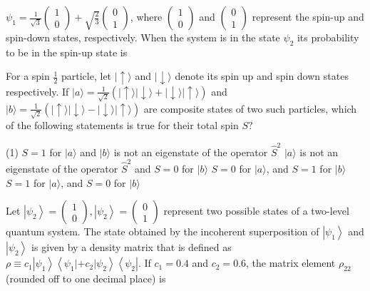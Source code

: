 \begin{enumerate}
\begin{minipage}{\textwidth}
	$\psi_{1}=\frac{1}{\sqrt{3}}\left(\begin{array}{l}1 \\ 0\end{array}\right)+\sqrt{\frac{2}{3}}\left(\begin{array}{l}0 \\ 1\end{array}\right)$, where $\left(\begin{array}{l}1 \\ 0\end{array}\right)$ and $\left(\begin{array}{l}0 \\ 1\end{array}\right)$ represent the spin-up and spin-down states, respectively. When the system is in the state $\psi_{2}$ its probability to be in the spin-up state is
\end{minipage}
\begin{minipage}{\textwidth}
	\item For a spin $\frac{1}{2}$ particle, let $|\uparrow\rangle$ and $|\downarrow\rangle$ denote its spin up and spin down states respectively. If $|a\rangle=\frac{1}{\sqrt{2}}(|\uparrow\rangle|\downarrow\rangle+|\downarrow\rangle|\uparrow\rangle)$ and $|b\rangle=\frac{1}{\sqrt{2}}(|\uparrow\rangle|\downarrow\rangle-|\downarrow\rangle|\uparrow\rangle)$ are composite states of two such particles, which of the following statements is true for their total spin $S ?$
\end{minipage}
\begin{tasks}(1)
	\task[\textbf{A.}] $S=1$ for $|a\rangle$ and $|b\rangle$ is not an eigenstate of the operator $\hat{S}^{2}$
	\task[\textbf{B.}]$|a\rangle$ is not an eigenstate of the operator $\hat{S}^{2}$ and $S=0$ for $|b\rangle$
	\task[\textbf{C.}]$S=0$ for $|a\rangle$, and $S=1$ for $|b\rangle$
	\task[\textbf{D.}]$S=1$ for $|a\rangle$, and $S=0$ for $|b\rangle$
\end{tasks}
\begin{minipage}{\textwidth}
	\item Let $\left|\psi_{2}\right\rangle=\left(\begin{array}{c}1 \\ 0\end{array}\right),\left|\psi_{2}\right\rangle=\left(\begin{array}{c}0 \\ 1\end{array}\right)$ represent two possible states of a two-level quantum system. The state obtained by the incoherent superposition of $\left|\psi_{1}\right\rangle$ and $\left|\psi_{2}\right\rangle$ is given by a density matrix that is defined as $\rho \equiv c_{1}\left|\psi_{1}\right\rangle\left\langle\psi_{1}\left|+c_{2}\right| \psi_{2}\right\rangle\left\langle\psi_{2}\right| .$ If $c_{1}=0.4$ and $c_{2}=0.6$, the matrix element $\rho_{22}$ (rounded off to one decimal place) is
\end{minipage}
\end{enumerate}
